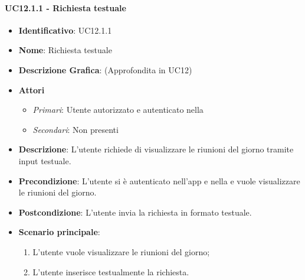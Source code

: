 \paragraph{UC12.1.1 - Richiesta testuale }
\begin{itemize}
	\item \textbf{Identificativo}: UC12.1.1
	\item \textbf{Nome}: Richiesta testuale
	\item\textbf{Descrizione Grafica}: (Approfondita in UC12)
	\item \textbf{Attori}
	\begin{itemize} 
		\item \textit{Primari}: Utente autorizzato e autenticato nella 
		\item \textit{Secondari}: Non presenti
	\end{itemize}
	\item \textbf{Descrizione}: L'utente richiede di visualizzare le riunioni del giorno tramite input testuale.
	\item \textbf{Precondizione}: L'utente si è autenticato nell'app e nella  e vuole visualizzare le riunioni del giorno.
	\item \textbf{Postcondizione}: L'utente invia la richiesta in formato testuale.
	\item \textbf{Scenario principale}:
	\begin{enumerate}
		\item L'utente vuole visualizzare le riunioni del giorno;
		\item L'utente inserisce testualmente la richiesta.
	\end{enumerate}
\end{itemize}

